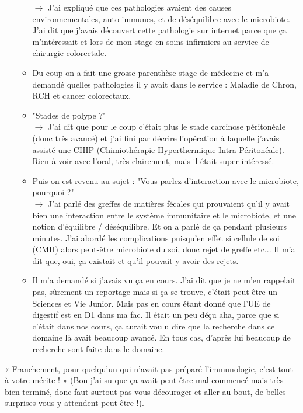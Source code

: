 \begin{enumerate}[label=\blacksquare]
\begin{itemize}
        $\longrightarrow$ J’ai expliqué que ces pathologies avaient des causes environnementales, auto-immunes, et de déséquilibre avec le microbiote. J’ai dit que j’avais découvert cette pathologie sur internet parce que ça m’intéressait et lors de mon stage en soins infirmiers au service de chirurgie colorectale.
        \item Du coup on a fait une grosse parenthèse stage de médecine et m’a demandé quelles pathologies il y avait dans le service : Maladie de Chron, RCH et cancer colorectaux.
        \item "Stades de polype ?"\\
        $\longrightarrow$ J’ai dit que pour le coup c’était plus le stade carcinose péritonéale (donc très avancé) et j’ai fini par décrire l’opération à laquelle j’avais assisté une CHIP (Chimiothérapie Hyperthermique Intra-Péritonéale). Rien à voir avec l’oral, très clairement, mais il était super intéressé.
        \item Puis on est revenu au sujet : "Vous parlez d’interaction avec le microbiote, pourquoi ?"\\
        $\longrightarrow$ J’ai parlé des greffes de matières fécales qui prouvaient qu’il y avait bien une interaction entre le système immunitaire et le microbiote, et une notion d’équilibre / déséquilibre. Et on a parlé de ça pendant plusieurs minutes. J’ai abordé les complications puisqu’en effet si cellule de soi (CMH) alors peut-être microbiote du soi, donc rejet de greffe etc... Il m’a dit que, oui, ça existait et qu’il pouvait y avoir des rejets.
        \item Il m’a demandé si j’avais vu ça en cours. J’ai dit que je ne m’en rappelait pas, sûrement un reportage mais si ça se trouve, c’était peut-être un Sciences et Vie Junior. Mais pas en cours étant donné que l'UE de digestif est en D1 dans ma fac. Il était un peu déçu aha, parce que si c’était dans nos cours, ça aurait voulu dire que la recherche dans ce domaine là avait beaucoup avancé. En tous cas, d’après lui beaucoup de recherche sont faite dans le domaine.
    \end{itemize}
\end{enumerate}


« Franchement, pour quelqu’un qui n’avait pas préparé l’immunologie, c’est tout à votre mérite ! » (Bon j’ai su que ça avait peut-être mal commencé mais très bien terminé, donc faut surtout pas vous décourager et aller au bout, de belles surprises vous y attendent peut-être !).\\

